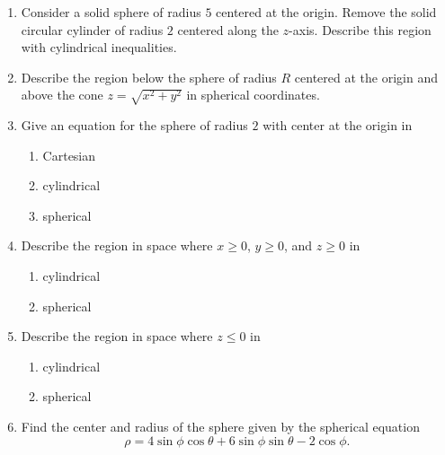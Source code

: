 \begin{enumerate}

\item  Consider a solid sphere of radius $5$ centered at the origin.  Remove the solid circular cylinder of radius $2$ centered along the $z$-axis.  Describe this region with cylindrical inequalities.  \\

\item  Describe the region below the sphere of radius $R$ centered at the origin and above the cone $z = \sqrt{x^2 + y^2}$ in spherical coordinates.  \\

\item  Give an equation for the sphere of radius $2$ with center at the origin in 
\begin{enumerate}
\item  Cartesian 
\item  cylindrical 
\item  spherical \\
\end{enumerate}

\item  Describe the region in space where $x \geq 0$, $y \geq 0$, and $z \geq 0$ in 
\begin{enumerate}
\item  cylindrical 
\item  spherical \\
\end{enumerate}

\item  Describe the region in space where $z \leq 0$ in 
\begin{enumerate}
\item  cylindrical 
\item  spherical \\
\end{enumerate}

\item  Find the center and radius of the sphere given by the spherical equation
\[
\rho = 4 \sin \phi \cos \theta + 6 \sin \phi \sin \theta - 2 \cos \phi.
\]
\end{enumerate}